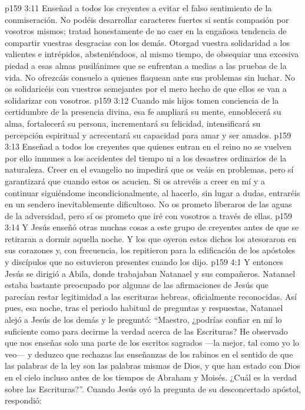\vs p159 3:11 Enseñad a todos los creyentes a evitar el falso sentimiento de la conmiseración. No podéis desarrollar caracteres fuertes si sentís compasión por vosotros mismos; tratad honestamente de no caer en la engañosa tendencia de compartir vuestras desgracias con los demás. Otorgad vuestra solidaridad a los valientes e intrépidos, absteniéndoos, al mismo tiempo, de obsequiar una excesiva piedad a esas almas pusilánimes que se enfrentan a medias a las pruebas de la vida. No ofrezcáis consuelo a quienes flaquean ante sus problemas sin luchar. No os solidaricéis con vuestros semejantes por el mero hecho de que ellos se van a solidarizar con vosotros.
\vs p159 3:12 \pc Cuando mis hijos tomen conciencia de la certidumbre de la presencia divina, esa fe ampliará su mente, ennoblecerá su alma, fortalecerá su persona, incrementará su felicidad, intensificará su percepción espiritual y acrecentará su capacidad para amar y ser amados.
\vs p159 3:13 Enseñad a todos los creyentes que quienes entran en el reino no se vuelven por ello inmunes a los accidentes del tiempo ni a los desastres ordinarios de la naturaleza. Creer en el evangelio no impedirá que os veáis en problemas, pero sí garantizará que  cuando estos os acucien. Si os atrevéis a creer en mí y a continuar siguiéndome incondicionalmente, al hacerlo, sin lugar a dudas, entraréis en un sendero inevitablemente dificultoso. No os prometo liberaros de las aguas de la adversidad, pero sí os prometo que iré con vosotros a través de ellas.
\vs p159 3:14 \pc Y Jesús enseñó otras muchas cosas a este grupo de creyentes antes de que se retiraran a dormir aquella noche. Y los que oyeron estos dichos los atesoraron en sus corazones y, con frecuencia, los repitieron para la edificación de los apóstoles y discípulos que no estuvieron presentes cuando los dijo.
\vs p159 4:1 Y entonces Jesús se dirigió a Abila, donde trabajaban Natanael y sus compañeros. Natanael estaba bastante preocupado por algunas de las afirmaciones de Jesús que parecían restar legitimidad a las escrituras hebreas, oficialmente reconocidas. Así pues, esa noche, tras el periodo habitual de preguntas y respuestas, Natanael alejó a Jesús de los demás y le preguntó: “Maestro, ¿podrías confiar en mí lo suficiente como para decirme la verdad acerca de las Escrituras? He observado que nos enseñas solo una parte de los escritos sagrados ---la mejor, tal como yo lo veo--- y deduzco que rechazas las enseñanzas de los rabinos en el sentido de que las palabras de la ley son las palabras mismas de Dios, y que han estado con Dios en el cielo incluso antes de los tiempos de Abraham y Moisés. ¿Cuál es la verdad sobre las Escrituras?”. Cuando Jesús oyó la pregunta de su desconcertado apóstol, respondió:
